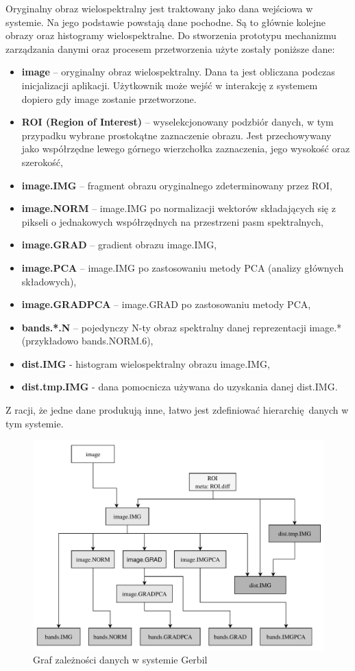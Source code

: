 Oryginalny obraz wielospektralny jest traktowany jako dana wejściowa w systemie. Na jego podstawie powstają dane pochodne. Są to głównie kolejne obrazy oraz histogramy wielospektralne. Do stworzenia prototypu mechanizmu zarządzania danymi oraz procesem przetworzenia użyte zostały poniższe dane:
\begin{itemize}
	\item {} \textbf{image} -- oryginalny obraz wielospektralny. Dana ta jest obliczana podczas inicjalizacji aplikacji. Użytkownik może wejść w interakcję z systemem dopiero gdy image zostanie przetworzone.
	\item {} \textbf{ROI (Region of Interest)} -- wyselekcjonowany podzbiór danych, w tym przypadku wybrane prostokątne zaznaczenie obrazu. Jest przechowywany jako współrzędne lewego górnego wierzchołka zaznaczenia, jego wysokość oraz szerokość,
	\item {} \textbf{image.IMG} -- fragment obrazu oryginalnego zdeterminowany przez ROI,
	\item {} \textbf{image.NORM} -- image.IMG po normalizacji wektorów składających się z pikseli o jednakowych współrzędnych na przestrzeni pasm spektralnych,
	\item {} \textbf{image.GRAD} -- gradient obrazu image.IMG,
	\item {} \textbf{image.PCA} -- image.IMG po zastosowaniu metody PCA (analizy głównych składowych),
	\item {} \textbf{image.GRADPCA} -- image.GRAD po zastosowaniu metody PCA,
	\item {} \textbf{bands.*.N} -- pojedynczy N-ty obraz spektralny danej reprezentacji image.* (przykładowo bands.NORM.6),
	\item {} \textbf{dist.IMG} - histogram wielospektralny obrazu image.IMG,
	\item {} \textbf{dist.tmp.IMG} - dana pomocnicza używana do uzyskania danej dist.IMG. 
\end{itemize}
Z racji, że jedne dane produkują inne, łatwo jest zdefiniować hierarchię danych w tym systemie.

\begin{figure}[ht]
	\centering
		\includegraphics[width=0.7\linewidth]{rys02/data-dependencies}
	\caption{Graf zależności danych w systemie Gerbil}
	\label{fig:data-dependencies}	
\end{figure}

